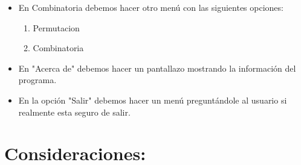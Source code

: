 \documentclass[10pt,a4paper]{article}
\begin{document}
\begin{itemize}
	\item En Combinatoria debemos hacer otro menú con las siguientes opciones:
	\begin{enumerate}
		\item Permutacion
		\item Combinatoria
	\end{enumerate}
	
	\item En "Acerca de" debemos hacer un pantallazo mostrando la información del programa.
	
	\item En la opción "Salir" debemos hacer un menú preguntándole al usuario si realmente esta seguro de salir.
	
\end{itemize}

\section{Consideraciones:}
\end{document}

